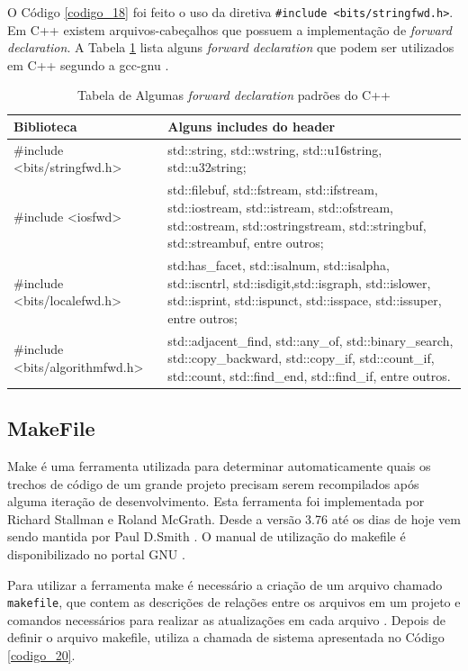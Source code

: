 O Código \ref{codigo_18} foi feito o uso da diretiva \texttt{\#include
 <bits/stringfwd.h>}. Em C++  existem arquivos-cabeçalhos que possuem a
 implementação de \textit{forward declaration}. A Tabela \ref{tab:tabela_04} lista 
 alguns \textit{forward declaration} que podem ser utilizados em C++ segundo
 a gcc-gnu \cite{gcc-api}.

\begin{table}[h]
    \centering
	\caption {Tabela de Algumas \textit{forward declaration} padrões do C++}
    \label{tab:tabela_04}
	\begin{tabularx}{0.95\textwidth}{>{\ttfamily}l>{\ttfamily}X}
	\toprule
	\textbf{Biblioteca} & \textbf{Alguns includes do header}\\
	\midrule
	\#include <bits/stringfwd.h> & std::string, std::wstring, std::u16string, std::u32string; \\
	\midrule
	\#include <iosfwd>          & std::filebuf, std::fstream, std::ifstream, std::iostream, std::istream, std::ofstream, std::ostream, std::ostringstream, std::stringbuf, std::streambuf, entre outros;\\
	\midrule
	\#include <bits/localefwd.h> & std:has\_facet, std::isalnum, std::isalpha, std::iscntrl, std::isdigit,std::isgraph, std::islower, std::isprint, std::ispunct, std::isspace, std::issuper, entre outros;\\
	\midrule
	\#include <bits/algorithmfwd.h> & std::adjacent\_find, std::any\_of, std::binary\_search, std::copy\_backward, std::copy\_if, std::count\_if, std::count, std::find\_end, std::find\_if, entre outros.\\
	\bottomrule
	\end{tabularx}
\end{table}


\subsection{MakeFile}\label{Makefile_section}


Make é uma ferramenta utilizada para determinar automaticamente quais
 os trechos de código de um grande projeto precisam serem recompilados
 após alguma iteração de desenvolvimento. Esta ferramenta foi implementada
 por Richard Stallman e Roland McGrath. Desde a versão 3.76 até os dias de
 hoje vem sendo mantida por Paul D.Smith \cite{Lasca2}. O manual de utilização do makefile
 é disponibilizado no portal GNU \cite{ref45}.

Para utilizar a ferramenta make é necessário a criação de um arquivo chamado
 \texttt{makefile}, que contem as descrições de relações entre os arquivos em um projeto
 e comandos necessários para realizar as atualizações em cada arquivo \cite{Lasca2}.
 Depois de definir o arquivo makefile, utiliza a chamada de sistema apresentada 
no Código \ref{codigo_20}.


